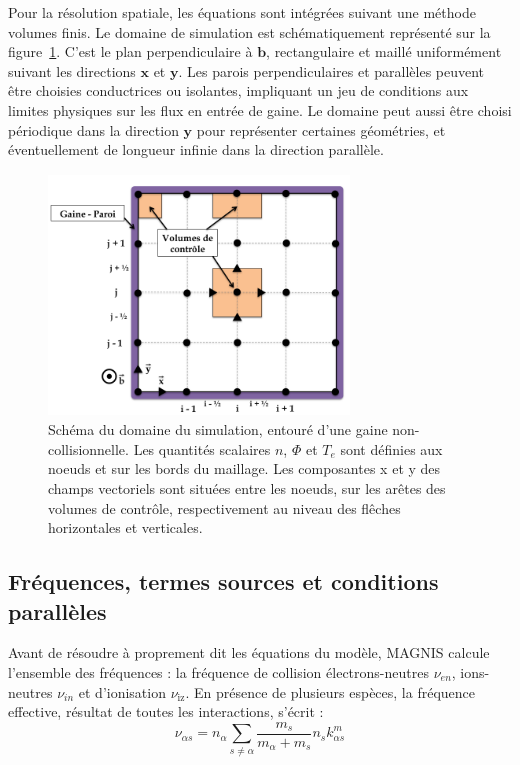 \begin{refsection}
Pour la résolution spatiale, les équations sont intégrées suivant une méthode
volumes finis. Le domaine de simulation est schématiquement représenté sur la figure~\ref{3-maillage}.
C'est le plan perpendiculaire à $\mathbf{b}$, rectangulaire et maillé uniformément suivant
les directions $\mathbf{x}$ et $\mathbf{y}$. Les parois perpendiculaires
et parallèles peuvent être choisies conductrices ou isolantes, impliquant un jeu
de conditions aux limites physiques sur les flux en entrée de gaine. Le domaine
peut aussi être choisi périodique dans la direction $\mathbf y$ pour représenter
certaines géométries, et éventuellement de longueur infinie dans la direction
parallèle.

\begin{figure}[htbp]
\centering
\includegraphics[height=64mm,width=80mm]{figures/3-magnisGrid.png}
{\caption{Schéma du domaine du simulation, entouré d'une gaine
non-collisionnelle.
Les quantités scalaires $n$, $\Phi$ et $T_e$ sont définies aux noeuds et sur les
bords du maillage. Les composantes x et y des champs vectoriels sont
situées entre les noeuds, sur les arêtes des volumes de contrôle, respectivement
au niveau des flêches horizontales et verticales.}
\label{3-maillage}}
\end{figure}

\subsection{Fréquences, termes sources et conditions parallèles}
Avant de résoudre à proprement dit les équations du modèle, MAGNIS
calcule l'ensemble des fréquences : la fréquence de
collision électrons-neutres $\nu_{en}$, ions-neutres $\nu_{in}$ et d'ionisation
$\nu_\text{iz}$. En présence de plusieurs espèces, la fréquence effective, résultat de toutes les
interactions, s'écrit :
\begin{equation*}
\nu_{\alpha s}=n_\alpha\sum_{s\neq\alpha} \frac{m_s}{m_\alpha+m_s}
n_sk^m_{\alpha s}
\end{equation*}


\end{refsection}
